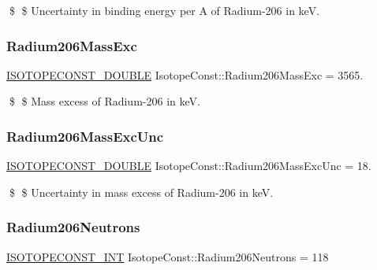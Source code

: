 \$ \$ Uncertainty in binding energy per A of Radium-\/206 in keV. \mbox{\label{group___isotope_const-_radium-_ra206_ga12326e2758f307b93ea9a2391c514f68}} 
\subsubsection{\texorpdfstring{Radium206\+Mass\+Exc}{Radium206MassExc}}
{\footnotesize\ttfamily \mbox{\hyperlink{group___isotope_const-_macros_ga8f45a7272ce02c0b4c65c44636ed719a}{I\+S\+O\+T\+O\+P\+E\+C\+O\+N\+S\+T\+\_\+\+D\+O\+U\+B\+LE}} Isotope\+Const\+::\+Radium206\+Mass\+Exc = 3565.}

\$ \$ Mass excess of Radium-\/206 in keV. \mbox{\label{group___isotope_const-_radium-_ra206_gaf128cc3390fc74df3aa1335f4b0b156f}} 
\subsubsection{\texorpdfstring{Radium206\+Mass\+Exc\+Unc}{Radium206MassExcUnc}}
{\footnotesize\ttfamily \mbox{\hyperlink{group___isotope_const-_macros_ga8f45a7272ce02c0b4c65c44636ed719a}{I\+S\+O\+T\+O\+P\+E\+C\+O\+N\+S\+T\+\_\+\+D\+O\+U\+B\+LE}} Isotope\+Const\+::\+Radium206\+Mass\+Exc\+Unc = 18.}

\$ \$ Uncertainty in mass excess of Radium-\/206 in keV. \mbox{\label{group___isotope_const-_radium-_ra206_gaabad4dc8fe30ac5f9a5b5e8e8949e83d}} 
\subsubsection{\texorpdfstring{Radium206\+Neutrons}{Radium206Neutrons}}
{\footnotesize\ttfamily \mbox{\hyperlink{group___isotope_const-_macros_ga5f18360b3e99483a35c32d789e62621c}{I\+S\+O\+T\+O\+P\+E\+C\+O\+N\+S\+T\+\_\+\+I\+NT}} Isotope\+Const\+::\+Radium206\+Neutrons = 118}


